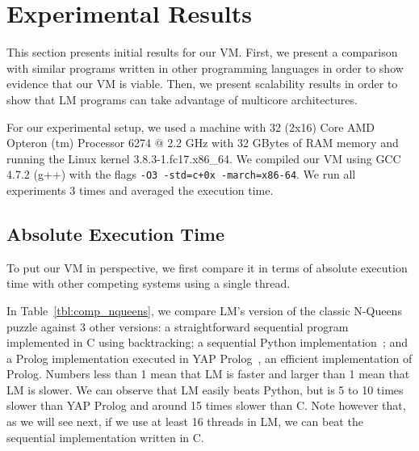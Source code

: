 \newcommand{\plotsize}{0.45\textwidth}


\section{Experimental Results}
\label{results}

This section presents initial results for our VM. First, we present a
comparison with similar programs written in other programming
languages in order to show evidence that our VM is viable. Then, we
present scalability results in order to show that LM programs can take
advantage of multicore architectures.

For our experimental setup, we used a machine with 32 (2x16) Core AMD
Opteron (tm) Processor 6274 $@$ 2.2 GHz with 32 GBytes of RAM memory
and running the Linux kernel 3.8.3-1.fc17.x86\_64.  We compiled our VM
using GCC 4.7.2 (g++) with the flags \texttt{-O3 -std=c+0x
  -march=x86-64}. We run all experiments 3 times and averaged the
execution time.


\subsection{Absolute Execution Time}

To put our VM in perspective, we first compare it in terms of absolute
execution time with other competing systems using a single thread.

In Table~\ref{tbl:comp_nqueens}, we compare LM's version of the
classic N-Queens puzzle against 3 other versions: a straightforward
sequential program implemented in C using backtracking; a sequential
Python implementation~\cite{vanRossum:1995:PRM}; and a Prolog
implementation executed in YAP
Prolog~\cite{DBLP:journals/corr/abs-1102-3896}, an efficient
implementation of Prolog. Numbers less than 1 mean that LM is faster
and larger than 1 mean that LM is slower. We can observe that LM
easily beats Python, but is 5 to 10 times slower than YAP Prolog and
around 15 times slower than C. Note however that, as we will see next,
if we use at least 16 threads in LM, we can beat the sequential
implementation written in C.

